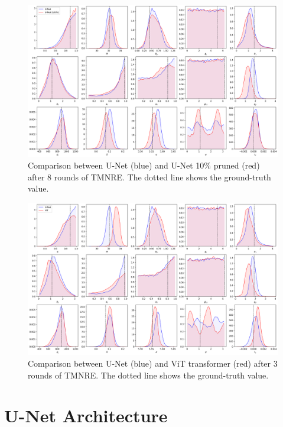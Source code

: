 \begin{appendices}
\begin{figure}[htb]
  \centering
  \includegraphics[width=0.85\linewidth]{media/images/Posteriors_UNet_pruned10_round_8.png}
  \caption{Comparison between U-Net (blue) and U-Net 10\% pruned (red) after 8 rounds of TMNRE. The dotted line shows the ground-truth value.}
  \label{fig:posterior_unet_pruned_10pc}
\end{figure}

\begin{figure}[htb]
  \centering
  \includegraphics[width=0.85\linewidth]{media/images/Posteriors_ViT_pretrained_2_round_3.png}
  \caption{Comparison between U-Net (blue) and ViT transformer (red) after 3 rounds of TMNRE. The dotted line shows the ground-truth value.}
  \label{fig:posterior_vit}
\end{figure}

\FloatBarrier

\section{U-Net Architecture}
\label{sec:apx:u-net_architecture}


\end{appendices}
